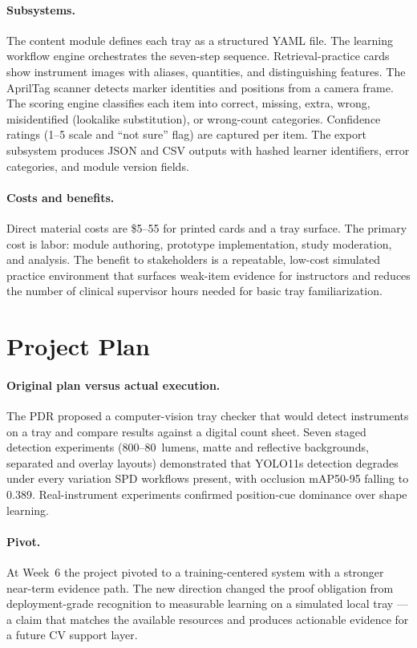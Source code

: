 \documentclass[10pt]{article}
\begin{document}
\paragraph{Subsystems.}
The content module defines each tray as a structured YAML file. The learning
workflow engine orchestrates the seven-step sequence. Retrieval-practice cards
show instrument images with aliases, quantities, and distinguishing features.
The AprilTag scanner detects marker identities and positions from a camera
frame. The scoring engine classifies each item into correct, missing, extra,
wrong, misidentified (lookalike substitution), or wrong-count categories.
Confidence ratings (1--5 scale and ``not sure'' flag) are captured per item.
The export subsystem produces JSON and CSV outputs with hashed learner
identifiers, error categories, and module version fields.

\paragraph{Costs and benefits.}
Direct material costs are \$5--55 for printed cards and a tray surface. The
primary cost is labor: module authoring, prototype implementation, study
moderation, and analysis. The benefit to stakeholders is a repeatable, low-cost
simulated practice environment that surfaces weak-item evidence for instructors
and reduces the number of clinical supervisor hours needed for basic tray familiarization.

\section*{Project Plan}

\paragraph{Original plan versus actual execution.}
The PDR proposed a computer-vision tray checker that would detect instruments
on a tray and compare results against a digital count sheet. Seven staged
detection experiments (800--80~lumens, matte and reflective backgrounds,
separated and overlay layouts) demonstrated that YOLO11s detection degrades
under every variation SPD workflows present, with occlusion mAP50-95 falling to
0.389. Real-instrument experiments confirmed position-cue dominance over shape
learning.

\paragraph{Pivot.}
At Week~6 the project pivoted to a training-centered system with a stronger
near-term evidence path. The new direction changed the proof obligation from
deployment-grade recognition to measurable learning on a simulated local
tray --- a claim that matches the available resources and produces actionable
evidence for a future CV support layer.
\end{document}
